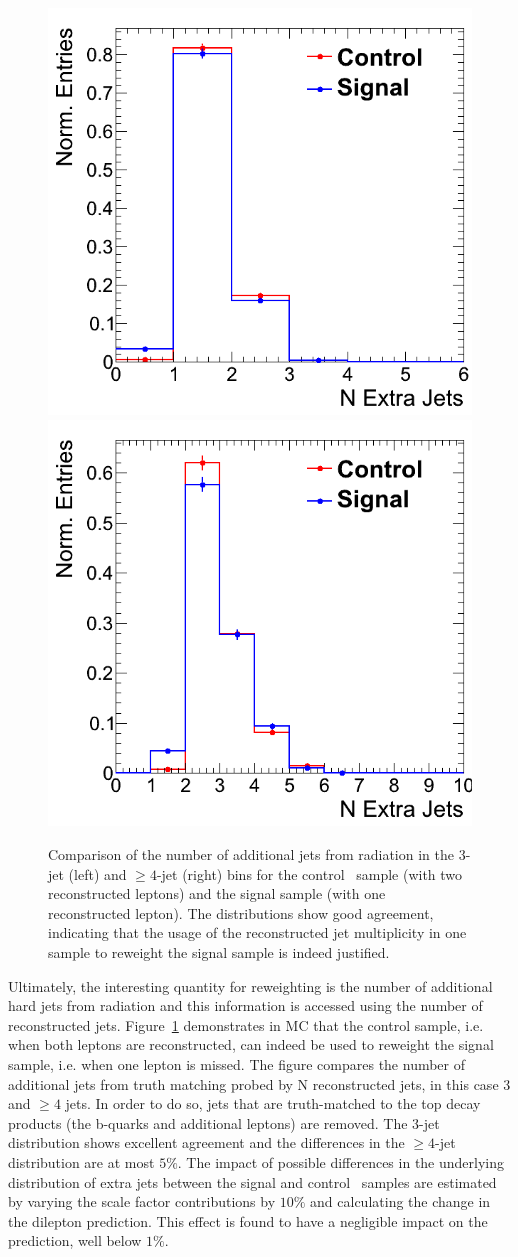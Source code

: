 \begin{figure}[hbt]
  \begin{center}
	\includegraphics[width=0.5\linewidth]{plots/ttdl_njets_presel_3j_comp.png}%
	\includegraphics[width=0.5\linewidth]{plots/ttdl_njets_presel_4j_comp.png}
	\caption{
	  \label{fig:dileptonnjets_signalcontrol_comp}%
          Comparison of the number of additional jets from radiation
          in the 3-jet (left) and $\ge4$-jet (right) bins for the control \ttll\
          sample (with two reconstructed leptons) and the signal
          sample (with one reconstructed lepton). The distributions
          show good agreement, indicating that the usage of the
          reconstructed jet multiplicity in one sample to reweight the
        signal sample is indeed justified.}  
      \end{center}
\end{figure}

Ultimately, the interesting quantity for reweighting is the number of
additional hard jets from radiation and this information is accessed using the
number of reconstructed
jets. Figure~\ref{fig:dileptonnjets_signalcontrol_comp} 
demonstrates in MC that the \ttll control sample, i.e. when both leptons are reconstructed,
can indeed be used to reweight the \ttll signal sample, i.e. when one lepton is missed.
The figure compares the
number of additional jets from truth matching probed by N
reconstructed jets, in this case 3 and $\ge4$ jets. In order to do so,
jets that are truth-matched to the top decay products (the b-quarks
and additional leptons) are removed. The 3-jet distribution shows 
excellent agreement and the differences in the $\ge4$-jet distribution 
are at most $5\%$. The impact of possible differences in the
underlying distribution of extra
jets between the signal and control \ttll\ samples are estimated by
varying the scale factor contributions by $10\%$ and calculating the
change in the dilepton prediction. This effect is found to have a
negligible impact on the prediction, well below $1\%$.

